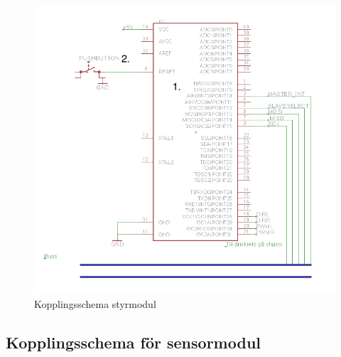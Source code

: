 \documentclass[a4paper,12pt,fleqn]{article}
\begin{document}
\begin{figure}[ht] %
  \begin{center}
  \includegraphics[keepaspectratio=true,width=\linewidth]{bilder/kopplingsschema_styrmodul.png}  %
  \end{center}
  \caption{Kopplingsschema styrmodul} %
  \label{fig:kopplingstyr} %
\end{figure}
 \clearpage %
 

\subsection*{Kopplingsschema för sensormodul}
\end{document}
